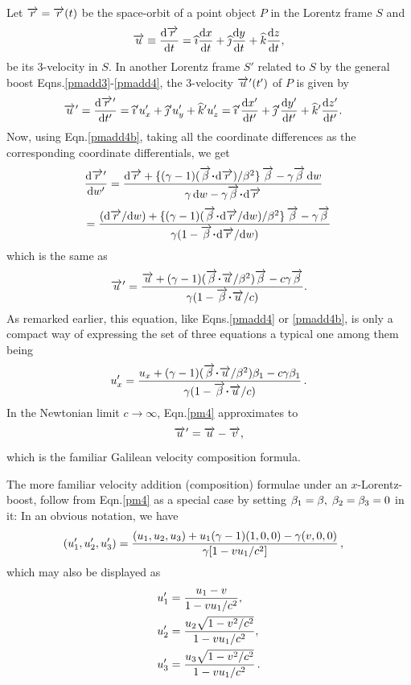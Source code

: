 Let $\overrightarrow{r}=\overrightarrow{r}(t)$ be the space-orbit of a 
point 
object 
$ P $ in the Lorentz frame $S$ and 
\begin{align*}
\overrightarrow{u} \equiv \frac{\mathrm{d}{\overrightarrow{r}}}{\mathrm{d}{t}} ={\widehat{\imath}}\frac{\mathrm{d}{x}}{\mathrm{d}{t}}
+ {\widehat{\jmath}}\frac{\mathrm{d}{y}}{\mathrm{d}{t}} +  {\widehat{k}}\frac{\mathrm{d}{z}}{\mathrm{d}{t}},
\end{align*} 
be its 3-velocity in $S$.  In another Lorentz frame 
$S'$ 
related to $S$ by the general boost 
Eqns.\eqref{pmadd3}-\eqref{pmadd4}, the 3-velocity 
${\overrightarrow{u}\hspace*{.3pt}'}(t') $ of $P$ is given by
\begin{align*}
{\ensuremath{\overrightarrow{u}\hspace*{.3pt}'}} 
&=\frac{\mathrm{d}{{\overrightarrow{r}\hspace*{.3pt}'}}}{\mathrm{d}{t'}}={\widehat{\imath}}' u'_x +{\widehat{\jmath}}' u'_y 
+{\widehat{k}}'u'_z ={\widehat{\imath}}' \frac{\mathrm{d}{x'}}{\mathrm{d}{t'}}+{\widehat{\jmath}}' \frac{\mathrm{d}{y'}}{\mathrm{d}{t'}} 
+ {\widehat{k}}' \frac{\mathrm{d}{z'}}{\mathrm{d}{t'}} .
\end{align*}
Now, using Eqn.\eqref{pmadd4b}, taking all the 
coordinate 
differences as the corresponding coordinate 
differentials, 
we get
\begin{align*}
&\dv{\pvec{r}}{w'}=\frac {\dd{\veca{r}}
+\{ (\gkg-1)(\veca{\gkb}\dotp \dd{\veca{r}})/\gkb^2 
\}\, 
\veca{\gkb}-\gkg\veca{\gkb}\,\dd{w}} {\gkg \,\dd{w}
-\gkg \veca{\gkb}\dotp \dd{\veca{r}}} 
\end{align*}
\begin{align*}
= \frac{(\dd \veca{r}/\dd w)+\{ (\gkg-1)(\veca{\gkb} 
\dotp \dd\veca{r}/\dd w)/\gkb^2 \}\, 
\veca{\gkb}-\gkg\veca{\gkb}} {\gkg(1 - \veca{\gkb} 
\dotp \dd\veca{r}/\dd w)}
\end{align*}
which is the same as
\begin{align}\label{pm4}
\pvec{u}=\frac{\veca{u}+ (\gkg-1)
(\veca{\gkb}\dotp\veca{u}/\gkb^2)\veca{\gkb}
-c\gkg\veca{\gkb}}{\gkg
(1-\veca{\gkb}\dotp \veca{u}/c)}.
\end{align}
As remarked earlier, this equation, like 
Eqns.\eqref{pmadd4} 
or \eqref{pmadd4b}, is only a compact way of expressing 
the 
set of three equations a typical one among them being
\begin{align*}
u'_x=\frac{u_x+ (\gkg-1)(\veca{\gkb}\dotp 
\veca{u}/\gkb^2) \gkb_1- c\gkg \gkb_1} 
{\gkg (1-\veca{\gkb}\dotp \veca{u}/c)}\,.
\end{align*}
In the Newtonian limit $c\rightarrow \infty$, 
Eqn.\eqref{pm4} approximates to
\begin{align}\label{pm4-add}
{\ensuremath{\overrightarrow{u}\hspace*{.3pt}'}}=\overrightarrow{u} -\overrightarrow{v},
\end{align}
which is the familiar Galilean velocity composition 
formula.

The more familiar velocity addition (composition) 
formulae 
under an $x$-Lorentz-boost, follow from Eqn.\eqref{pm4} 
as 
a 
special case by setting ${\beta}_1 
={\beta},\;{\beta}_2={\beta}_3=0$ in 
it: In an obvious notation, we have
\begin{align*}
(u'_1,u'_2,u'_3)&=\frac{(u_1,u_2,u_3) +u_1 
({\gamma}-1)
(1,0,0)-{\gamma}(v,0,0)}{{\gamma} [1-vu_1/c^2]}\,,
\end{align*}
which may also be displayed as
\begin{align}\label{pm5}
u'_1&=\frac{u_1 -v}{1-vu_1/c^2},\notag\\ u'_2 &=
\frac{u_2\sqrt{1-v^2/c^2} }{ 1-vu_1/c^2}, \notag\\ 
u'_3&=\frac{u_3\sqrt{1-v^2/c^2} }{1-vu_1/c^2}\,.
\end{align}

